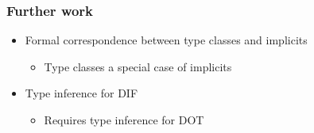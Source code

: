 \begin{frame}
    \frametitle{Further work}
    \begin{itemize}
        \pause \item Formal correspondence between type classes and implicits
        \begin{itemize}
            \pause \item Type classes a special case of implicits
        \end{itemize}
        \pause \item Type inference for DIF
        \begin{itemize}
            \pause \item Requires type inference for DOT
        \end{itemize}
    \end{itemize}
\end{frame}

\begin{frame}
\end{frame}
